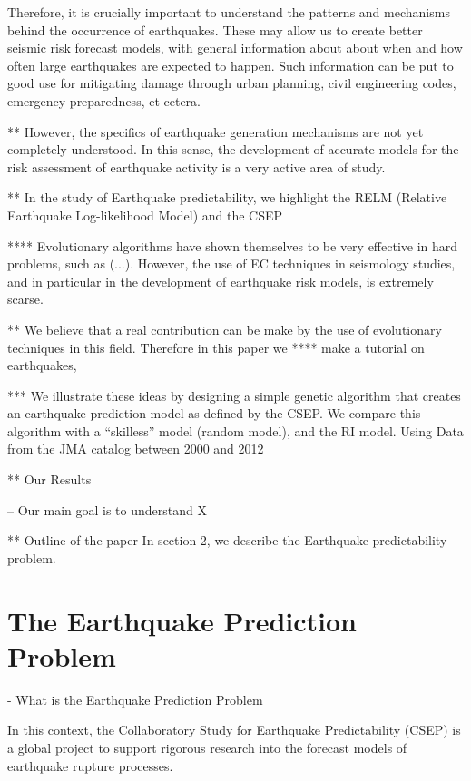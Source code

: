\documentclass{sig-alternate}
\begin{document}
Therefore, it is crucially important to understand the patterns and
mechanisms behind the occurrence of earthquakes. These may allow us to
create better seismic risk forecast models, with general information
about about when and how often large earthquakes are expected to
happen. Such information can be put to good use for mitigating damage
through urban planning, civil engineering codes, emergency
preparedness, et cetera.




** However, the specifics of earthquake generation mechanisms are not
yet completely understood. In this sense, the development of accurate
models for the risk assessment of earthquake activity is a very active
area of study.

** In the study of Earthquake predictability, we highlight the RELM
(Relative Earthquake Log-likelihood Model) and the CSEP

**** Evolutionary algorithms have shown themselves to be very
effective in hard problems, such as (...). However, the use of EC
techniques in seismology studies, and in particular in the development
of earthquake risk models, is extremely scarse.

** We believe that a real contribution can be make by the use of
evolutionary techniques in this field. Therefore in this paper we ****
make a tutorial on earthquakes,

*** We illustrate these ideas by designing a simple genetic algorithm
that creates an earthquake prediction model as defined by the CSEP. We
compare this algorithm with a ``skilless'' model (random model), and
the RI model. Using Data from the JMA catalog between 2000 and 2012

** Our Results

-- Our main goal is to understand X

** Outline of the paper
In section 2, we describe the Earthquake predictability problem.


\section{The Earthquake Prediction Problem}

- What is the Earthquake Prediction Problem

In this context, the Collaboratory Study for Earthquake Predictability
(CSEP) is a global project to support rigorous research into the
forecast models of earthquake rupture processes.  
\end{document}
